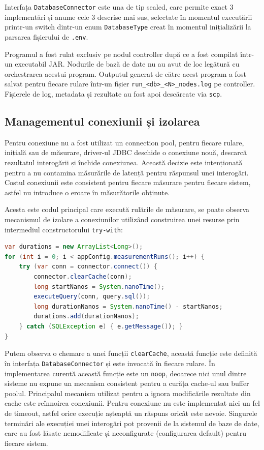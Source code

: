 Interfața \texttt{DatabaseConnector} este una de tip sealed, care permite exact 3 implementări și anume cele 3 descrise mai sus, selectate în momentul executării printr-un switch dintr-un enum \texttt{DatabaseType} creat în momentul inițializării la parsarea fișierului de \texttt{.env}.

Programul a fost rulat exclusiv pe nodul controller după ce a fost compilat într-un executabil JAR. Nodurile de bază de date nu au avut de loc legătură cu orchestrarea acestui program. Outputul generat de către acest program a fost salvat pentru fiecare rulare într-un fișier \texttt{run\_<db>\_<N>\_nodes.log} pe controller. Fișierele de log, metadata și rezultate au fost apoi descărcate via \texttt{scp}.

\subsection{Managementul conexiunii și izolarea}

Pentru conexiune nu a fost utilizat un connection pool, pentru fiecare rulare, inițială sau de măsurare, driver-ul JDBC deschide o conexiune nouă, descarcă rezultatul interogării și închide conexiunea. Această decizie este intenționată pentru a nu contamina măsurările de latență pentru răspunsul unei interogări. Costul conexiunii este consistent pentru fiecare măsurare pentru fiecare sistem, astfel nu introduce o eroare în măsurătorile obținute.

Acesta este codul principal care execută rulările de măsurare, se poate observa mecanismul de izolare a conexiunilor utilizând construirea unei resurse prin intermediul constructorului \texttt{try-with}:

\begin{lstlisting}[language=Java, caption={Ciclu de viață al unei conexiuni}, label={lst:timing}]
var durations = new ArrayList<Long>();
for (int i = 0; i < appConfig.measurementRuns(); i++) {
    try (var conn = connector.connect()) {
        connector.clearCache(conn);
        long startNanos = System.nanoTime();
        executeQuery(conn, query.sql());
        long durationNanos = System.nanoTime() - startNanos;
        durations.add(durationNanos);
    } catch (SQLException e) { e.getMessage()); }
}
\end{lstlisting}

Putem observa o chemare a unei funcții \texttt{clearCache}, această funcție este definită în interfața \texttt{DatabaseConnector} și este invocată în fiecare rulare. În implementarea curentă această funcție este un \texttt{noop}, deoarece nici unul dintre sisteme nu expune un mecanism consistent pentru a curăța cache-ul sau buffer poolul. Principalul mecanism utilizat pentru a ignora modificările rezultate din cache este reînnoirea conexiunii. Pentru conexiune nu este implementat nici un fel de timeout, astfel orice execuție așteaptă un răspuns oricât este nevoie. Singurele terminări ale execuției unei interogări pot provenii de la sistemul de baze de date, care au fost lăsate nemodificate și neconfigurate (configurarea default) pentru fiecare sistem.

